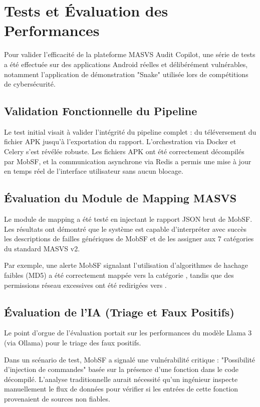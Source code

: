 \chapter{Tests et Évaluation des Performances}
\label{chap:tests}

Pour valider l'efficacité de la plateforme MASVS Audit Copilot, une série de tests a été effectuée sur des applications Android réelles et délibérément vulnérables, notamment l'application de démonstration "Snake" utilisée lors de compétitions de cybersécurité.

\section{Validation Fonctionnelle du Pipeline}
Le test initial visait à valider l'intégrité du pipeline complet : du téléversement du fichier APK jusqu'à l'exportation du rapport.
L'orchestration via Docker et Celery s'est révélée robuste. Les fichiers APK ont été correctement décompilés par MobSF, et la communication asynchrone via Redis a permis une mise à jour en temps réel de l'interface utilisateur sans aucun blocage.

\section{Évaluation du Module de Mapping MASVS}
Le module de mapping a été testé en injectant le rapport JSON brut de MobSF. Les résultats ont démontré que le système est capable d'interpréter avec succès les descriptions de failles génériques de MobSF et de les assigner aux 7 catégories du standard MASVS v2.

Par exemple, une alerte MobSF signalant l'utilisation d'algorithmes de hachage faibles (MD5) a été correctement mappée vers la catégorie , tandis que des permissions réseau excessives ont été redirigées vers .

\section{Évaluation de l'IA (Triage et Faux Positifs)}
Le point d'orgue de l'évaluation portait sur les performances du modèle Llama 3 (via Ollama) pour le triage des faux positifs.

Dans un scénario de test, MobSF a signalé une vulnérabilité critique : "Possibilité d'injection de commandes" basée sur la présence d'une fonction  dans le code décompilé.
L'analyse traditionnelle aurait nécessité qu'un ingénieur inspecte manuellement le flux de données pour vérifier si les entrées de cette fonction provenaient de sources non fiables.

